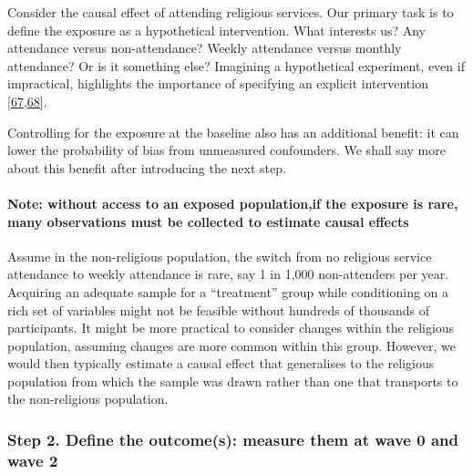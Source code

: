 \documentclass[
  singlecolumn]{article}
\let\oldparagraph\paragraph
\renewcommand{\paragraph}[1]{\oldparagraph{#1}\mbox{}}
\begin{document}
Consider the causal effect of attending religious services. Our primary
task is to define the exposure as a hypothetical intervention. What
interests us? Any attendance versus non-attendance? Weekly attendance
versus monthly attendance? Or is it something else? Imagining a
hypothetical experiment, even if impractical, highlights the importance
of specifying an explicit intervention
{[}\protect\hyperlink{ref-hernuxe1n2022}{67},\protect\hyperlink{ref-hernuxe1n2016a}{68}{]}.

Controlling for the exposure at the baseline also has an additional
benefit: it can lower the probability of bias from unmeasured
confounders. We shall say more about this benefit after introducing the
next step.

\hypertarget{note-without-access-to-an-exposed-populationif-the-exposure-is-rare-many-observations-must-be-collected-to-estimate-causal-effects}{%
\paragraph{\texorpdfstring{\textbf{Note: without access to an exposed
population,if the exposure is rare, many observations must be collected
to estimate causal
effects}}{Note: without access to an exposed population,if the exposure is rare, many observations must be collected to estimate causal effects}}\label{note-without-access-to-an-exposed-populationif-the-exposure-is-rare-many-observations-must-be-collected-to-estimate-causal-effects}}

Assume in the non-religious population, the switch from no religious
service attendance to weekly attendance is rare, say 1 in 1,000
non-attenders per year. Acquiring an adequate sample for a ``treatment''
group while conditioning on a rich set of variables might not be
feasible without hundreds of thousands of participants. It might be more
practical to consider changes within the religious population, assuming
changes are more common within this group. However, we would then
typically estimate a causal effect that generalises to the religious
population from which the sample was drawn rather than one that
transports to the non-religious population.

\hypertarget{step-2.-define-the-outcomes-measure-them-at-wave-0-and-wave-2}{%
\subsubsection{Step 2. Define the outcome(s): measure them at wave 0 and
wave
2}\label{step-2.-define-the-outcomes-measure-them-at-wave-0-and-wave-2}}
\end{document}
